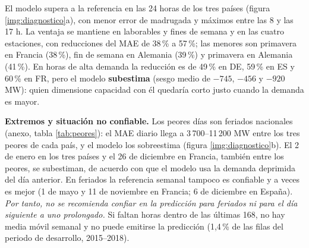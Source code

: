 El modelo supera a la referencia en las 24 horas de los tres países (figura \ref{img:diagnostico}a), con menor error de madrugada y máximos entre las 8 y las 17 h. La ventaja se mantiene en laborables y fines de semana y en las cuatro estaciones, con reducciones del MAE de 38\,\% a 57\,\%; las menores son primavera en Francia (38\,\%), fin de semana en Alemania (39\,\%) y primavera en Alemania (41\,\%). En horas de alta demanda la reducción es de 49\,\% en DE, 59\,\% en ES y 60\,\% en FR, pero el modelo \textbf{subestima} (sesgo medio de $-745$, $-456$ y $-920$ MW): quien dimensione capacidad con él quedaría corto justo cuando la demanda es mayor.

\textbf{Extremos y situación no confiable.} Los peores días son feriados nacionales (anexo, tabla \ref{tab:peores}): el MAE diario llega a 3\,700--11\,200 MW entre los tres peores de cada país, y el modelo los sobreestima (figura \ref{img:diagnostico}b). El 2 de enero en los tres países y el 26 de diciembre en Francia, también entre los peores, se subestiman, de acuerdo con que el modelo usa la demanda deprimida del día anterior. En feriados la referencia semanal tampoco es confiable y a veces es mejor (1 de mayo y 11 de noviembre en Francia; 6 de diciembre en España). \emph{Por tanto, no se recomienda confiar en la predicción para feriados ni para el día siguiente a uno prolongado.} Si faltan horas dentro de las últimas 168, no hay media móvil semanal y no puede emitirse la predicción (1,4\,\% de las filas del periodo de desarrollo, 2015--2018).
